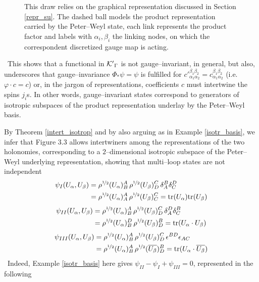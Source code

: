 \begin{figure}[ht]
    \centering
    
    \caption{This draw relies on the graphical representation discussed in Section \ref{repr_su}. The dashed ball models the product representation carried by the Peter--Weyl state, each link represents the product factor and labels with $\alpha_i,\beta_i$ the linking nodes, on which the correspondent discretized gauge map is acting.}
\end{figure}
\,\newline
This shows that a functional in ${\mathcal{K}'}_\Gamma$ is not gauge--invariant, in general, but also, underscores that gauge--invariance $\Phi_*\psi=\psi$ is fulfilled for ${c'}^{\beta_1\beta_2}_{\alpha_1\alpha_2}=c^{\beta_1\beta_2}_{\alpha_1\alpha_2}$ {(i.e. $\varphi\cdot c=c$)} or, in the jargon of representations, coefficients $c$ must intertwine the spins ${j_i}$s. In other words, gauge--invariant states correspond to generators of isotropic subspaces of the product representation underlay by the Peter--Weyl basis.

By Theorem \ref{intert_isotrop} and by also arguing as in Example \ref{isotr_basis}, we infer that Figure 3.3 allows intertwiners among the representations of the two holonomies, corresponding to a $2$--dimensional isotropic subspace of the Peter--Weyl underlying representation, showing that multi--loop states are not independent
\begin{align*}
    \psi_I(U_\alpha,U_\beta)&=\rho^{\nicefrac{1}{2}}(U_\alpha)^A_B\,\rho^{\nicefrac{1}{2}}(U_\beta)^C_D\,\delta^B_A\delta^D_C\\
    &=\rho^{\nicefrac{1}{2}}(U_\alpha)^A_A\,\rho^{\nicefrac{1}{2}}(U_\beta)^C_C=\text{\normalfont tr}(U_\alpha)\text{\normalfont tr}(U_\beta)
\end{align*}
\begin{align*}
    \psi_{II}(U_\alpha,U_\beta)&=\rho^{\nicefrac{1}{2}}(U_\alpha)^A_B\,\rho^{\nicefrac{1}{2}}(U_\beta)^C_D\,\delta^D_A\delta^B_C\\
    &=\rho^{\nicefrac{1}{2}}(U_\alpha)^D_B\,\rho^{\nicefrac{1}{2}}(U_\beta)^B_D=\text{\normalfont tr}(U_\alpha\cdot U_\beta)
\end{align*}
\begin{align*}
    \psi_{III}(U_\alpha,U_\beta)&=\rho^{\nicefrac{1}{2}}(U_\alpha)^A_B\,\rho^{\nicefrac{1}{2}}(U_\beta)^C_D\,\epsilon^{BD}\epsilon_{AC}\\
    &=\rho^{\nicefrac{1}{2}}(U_\alpha)^A_B\,\rho^{\nicefrac{1}{2}}(\overline{U_\beta})^B_D=\text{\normalfont tr}(U_\alpha\cdot\overline{U_\beta})
\end{align*}
\,\newline
 Indeed, Example \ref{isotr_basis} here gives $\psi_{II}-\psi_I+\psi_{III}=0$, represented in the following

